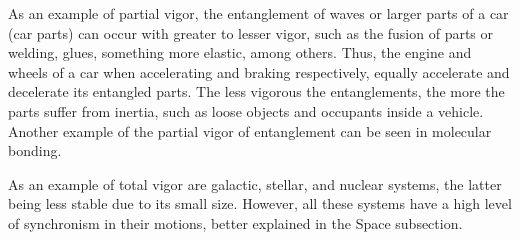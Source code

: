 As an example of partial vigor, the entanglement of waves or larger parts of a car (car parts) can occur with greater to lesser vigor, such as the fusion of parts or welding, glues, something more elastic, among others. Thus, the engine and wheels of a car when accelerating and braking respectively, equally accelerate and decelerate its entangled parts. The less vigorous the entanglements, the more the parts suffer from inertia, such as loose objects and occupants inside a vehicle. Another example of the partial vigor of entanglement can be seen in molecular bonding.

As an example of total vigor are galactic, stellar, and nuclear systems, the latter being less stable due to its small size. However, all these systems have a high level of synchronism in their motions, better explained in the Space subsection.

